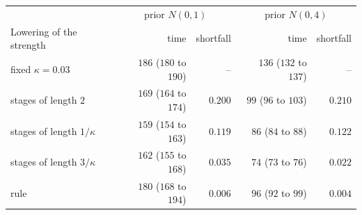 \begin{tabular}{lrrrr}
\toprule
 & \multicolumn{2}{c}{prior $N(0,1)$} & \multicolumn{2}{c}{prior $N(0,4)$} \\
Lowering of the strength & time & shortfall & time & shortfall \\
\midrule
fixed $\kappa=0.03$ & $186$ ($180$ to $190$) & -- & $136$ ($132$ to $137$) & -- \\
stages of length $2$ & $169$ ($164$ to $174$) & $0.200$ & $99$ ($96$ to $103$) & $0.210$ \\
stages of length $1/\kappa$ & $159$ ($154$ to $163$) & $0.119$ & $86$ ($84$ to $88$) & $0.122$ \\
stages of length $3/\kappa$ & $162$ ($155$ to $168$) & $0.035$ & $74$ ($73$ to $76$) & $0.022$ \\
rule & $180$ ($168$ to $194$) & $0.006$ & $96$ ($92$ to $99$) & $0.004$ \\
\bottomrule
\end{tabular}
